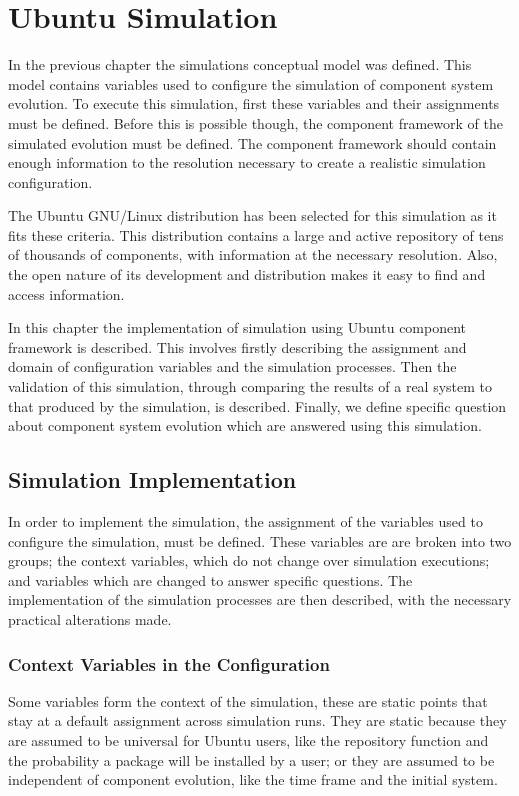 
\chapter{Ubuntu Simulation}
\label{ubunutsimulation}
In the previous chapter the simulations conceptual model was defined.
This model contains variables used to configure the simulation of component system evolution.
To execute this simulation, first these variables and their assignments must be defined.
Before this is possible though, the component framework of the simulated evolution must be defined.
The component framework should contain enough information to the resolution necessary to create a realistic simulation configuration.

The Ubuntu GNU/Linux distribution has been selected for this simulation as it fits these criteria.
This distribution contains a large and active repository of tens of thousands of components, with information at the necessary resolution.
Also, the open nature of its development and distribution makes it easy to find and access information.

In this chapter the implementation of simulation using Ubuntu component framework is described.
This involves firstly describing the assignment and domain of configuration variables and the simulation processes.
Then the validation of this simulation, through comparing the results of a real system to that produced by the simulation, is described. 
Finally, we define specific question about component system evolution which are answered using this simulation.

\section{Simulation Implementation}
In order to implement the simulation, the assignment of the variables used to configure the simulation, must be defined.
These variables are are broken into two groups; the context variables, which do not change over simulation executions; 
and variables which are changed to answer specific questions.
The implementation of the simulation processes are then described, with the necessary practical alterations made. 


\subsection{Context Variables in the Configuration}
Some variables form the context of the simulation, these are static points that stay at a default assignment across simulation runs.
They are static because they are assumed to be universal for Ubuntu users, like the repository function and the probability a package will be installed by a user;
or they are assumed to be independent of component evolution, like the time frame and the initial system.

